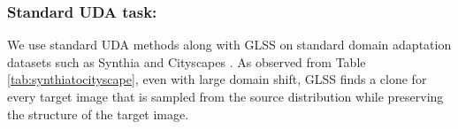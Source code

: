 \documentclass[runningheads]{llncs}
\begin{document}
\subsubsection{Standard UDA task:}
We use standard UDA methods along with GLSS on standard domain adaptation datasets such as Synthia \cite{ros2016synthia} and Cityscapes \cite{cordts2016cityscapes}. As observed from Table \ref{tab:synthiatocityscape}, even with large domain shift, GLSS finds a clone for every target image that is sampled from the source distribution while preserving the structure of the target image.
\begin{table}[h]
\caption{Empirical analysis of GLSS on standard domain adaptaion task of adapting  Synthia \cite{ros2016synthia} to Cityscapes \cite{cordts2016cityscapes}. We calculate the mean IoU for 13 classes (mIoU) and 16 classes (mIoU*).}
\begin{center}
\end{center}
\label{tab:synthiatocityscape}
\end{table}
\end{document}
